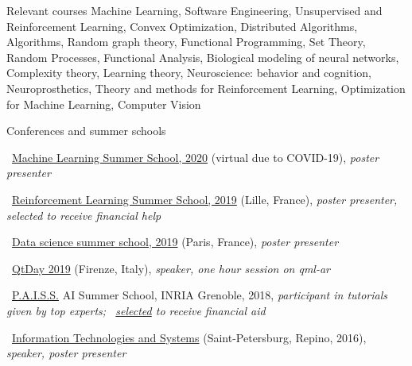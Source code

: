 \documentclass{resume} %
\newcommand*{\mybold}[1]{{\color{gray} #1}}
\newcommand{\mylink}{{\color{gray}\faExternalLink}}
\begin{document}
\begin{rSection}{Relevant courses}
	\mybold{Machine Learning, Software Engineering,} {\small Unsupervised and Reinforcement Learning, Convex Optimization, Distributed Algorithms, Algorithms, Random graph theory, Functional Programming, Set Theory, Random Processes, Functional Analysis, Biological modeling of neural networks, Complexity theory, Learning theory, Neuroscience: behavior and cognition, Neuroprosthetics, Theory and methods for Reinforcement Learning, Optimization for Machine Learning, Computer Vision}
\end{rSection}

\newpage
\begin{rSection}{Conferences and summer schools}
\vspace{-1em}
\item  \mylink~\href{http://mlss.tuebingen.mpg.de/2020/}{Machine Learning Summer School, 2020} (virtual due to COVID-19){, \em \mybold{poster} presenter}
\item  \mylink~\href{https://rlss.inria.fr}{Reinforcement Learning Summer School, 2019} (Lille, France){, \em \mybold{poster} presenter, selected to receive \mybold{financial help}}
\item  \mylink~\href{https://ds3-datascience-polytechnique.fr}{Data science summer school, 2019} (Paris, France){, \em \mybold{poster} presenter}
\item  \mylink~\href{https://youtu.be/rmaAGNuKy3c}{QtDay 2019} (Firenze, Italy){, \em \mybold{speaker,} one hour session on qml-ar}
\item  \mylink~\href{https://project.inria.fr/paiss/}{P.A.I.S.S.} AI Summer School, INRIA Grenoble, 2018{, \em participant in tutorials given by top experts; \mylink~\href{http://www.europe.naverlabs.com/Blog/Students-at-PAISS}{selected} to receive financial aid}
\item  \mylink~\href{http://iitp.ru/en/conferences/itas}{Information Technologies and Systems} (Saint-Petersburg, Repino, 2016){, \em \mybold{speaker,} poster presenter}
\end{rSection}
\end{document}
